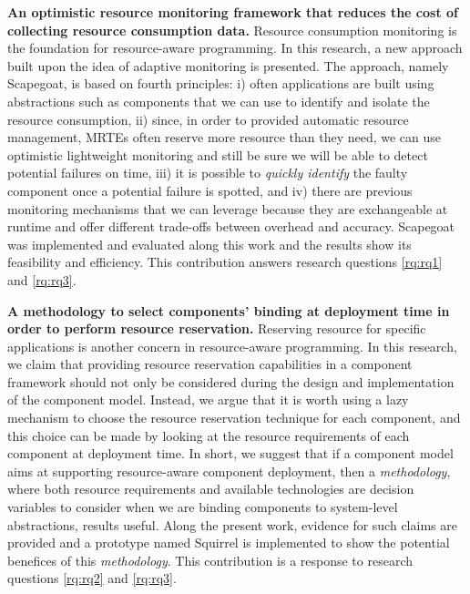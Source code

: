 \textbf{An optimistic resource monitoring framework that reduces the cost of collecting resource consumption data.}
Resource consumption monitoring is the foundation for resource-aware programming.
In this research, a new approach built upon the idea of adaptive monitoring is presented.
The approach, namely Scapegoat, is based on fourth principles: i) often applications are built using abstractions such as components that we can use to identify and isolate the resource consumption, ii) since, in order to provided automatic resource management, MRTEs often reserve more resource than they need, we can use optimistic lightweight monitoring and still be sure we will be able to detect potential failures on time, iii) it is possible to \textit{quickly identify} the faulty component once a potential failure is spotted, and iv) there are previous monitoring mechanisms that we can leverage because they are exchangeable at runtime and offer different trade-offs between overhead and accuracy.
Scapegoat was implemented and evaluated along this work and the results show its feasibility and efficiency.
This contribution answers research questions \ref{rq:rq1} and \ref{rq:rq3}.

\textbf{A methodology to select components' binding at deployment time in order to perform resource reservation.}
Reserving resource for specific applications is another concern in resource-aware programming.
In this research, we claim that providing resource reservation capabilities in a component framework should not only be considered during the design and implementation of the component model.
Instead, we argue that it is worth using a lazy mechanism to choose the resource reservation technique for each component, and this choice can be made by looking at the resource requirements of each component at deployment time.
In short, we suggest that if a component model aims at supporting resource-aware component deployment, then a \textit{methodology}, where both resource requirements and available technologies are decision variables to consider when we are binding components to system-level abstractions, results useful.
Along the present work, evidence for such claims are provided and a prototype named Squirrel is implemented to show the potential benefices of this \textit{methodology}.
This contribution is a response to research questions \ref{rq:rq2} and \ref{rq:rq3}.

